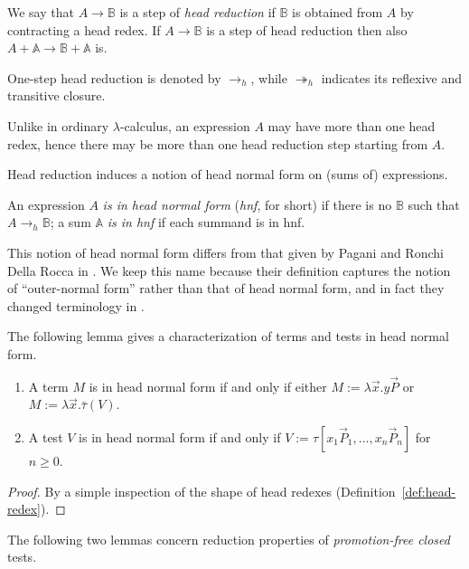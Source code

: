 \documentclass{LMCS}
\newcommand{\lam}{\ensuremath{\lambda}}
\newcommand{\msto}{\twoheadrightarrow}
\newcommand{\toh}{\to_{h}}\newcommand{\mstoh}{\msto_{h}}\newcommand{\lsubst}[2]{\langle #2 / #1 \rangle}	\newcommand{\llsubst}[2]{\langle\!\langle #2 / #1 \rangle\!\rangle}
\newcommand{\ass}{:=}
\newcommand{\seq}[1]{\vec{#1}}
\newcommand{\sA}{\mathbb{A}}
\newcommand{\sB}{\mathbb{B}}
\newcommand{\gt}{\ensuremath{\tau}}
\newcommand{\gto}{\ensuremath{\bar\tau}}
\begin{document}
\begin{defi} 
We say that $A\to \sB$ is a step of \emph{head reduction} if $\sB$ is obtained from $A$ by contracting a head redex.
If $A\to \sB$ is a step of head reduction then also $A+\sA\to \sB + \sA$ is.
\end{defi}

One-step head reduction is denoted by $\toh$, while $\mstoh$ indicates its reflexive and transitive closure.

\begin{rem}
Unlike in ordinary \lam-calculus, an expression $A$ may have more than one head redex, hence there may be more than one head reduction step starting from $A$.
\end{rem}

Head reduction induces a notion of head normal form on (sums of) expressions.

\begin{defi}
An expression $A$ \emph{is in head normal form} (\emph{hnf}, for short) if there is no $\sB$ such that $A\toh \sB$; 
a sum $\sA$ \emph{is in hnf} if each summand is in hnf.
\end{defi}

This notion of head normal form differs from that given by Pagani and Ronchi Della Rocca in \cite{PaganiR10}.
We keep this name because their definition captures the notion of ``outer-normal form'' rather than that of head normal form,
and in fact they changed terminology in \cite{PaganiR11}.

The following lemma gives a characterization of terms and tests in head normal form.

\begin{lem}\label{lemma:char-hnf}\hfill
\begin{enumerate}[\em(i)]
\item A term $M$ is in head normal form if and only if either $M\ass \lam\seq x.y\seq P$ or $M\ass \lam\seq x.\gto(V)$.
\item A test $V$ is in head normal form if and only if $V\ass \gt[x_1\seq P_1,\dots,x_n\seq P_n]$ for $n\ge 0$.
\end{enumerate}
\end{lem}

\begin{proof} By a simple inspection of the shape of head redexes (Definition~\ref{def:head-redex}).
\end{proof}

The following two lemmas concern reduction properties of \emph{promotion-free closed} tests.
\end{document}
